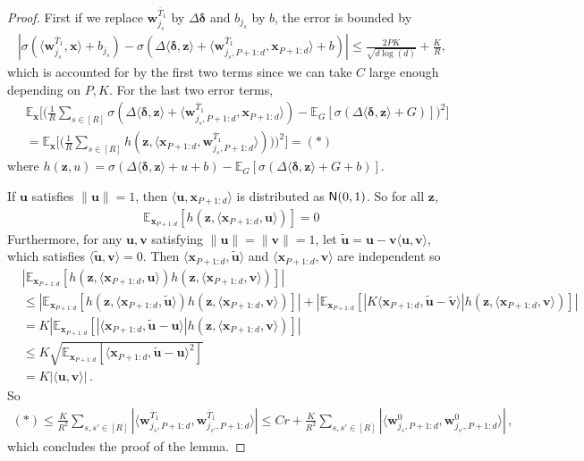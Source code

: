 \documentclass[11pt]{article}
\newcommand{\E}{\mathbb{E}}
\newcommand{\<}{\langle}
\renewcommand{\>}{\rangle}
\theoremstyle{definition}
\def\bu{{\boldsymbol u}}
\def\bv{{\boldsymbol v}}
\def\bw{{\boldsymbol w}}
\def\bx{{\boldsymbol x}}
\def\bz{{\boldsymbol z}}
\def\bdelta{{\boldsymbol\delta}}
\def\normal{{\sf N}}
\def\normal{{\sf N}}
\def\normal{{\sf N}}
\def\bz{{\boldsymbol z}}
\def\bdelta{{\boldsymbol\delta}}
\def\bu{{\boldsymbol u}}
\def\bv{{\boldsymbol v}}
\def\bw{{\boldsymbol w}}
\def\bx{{\boldsymbol x}}
\def\bz{{\boldsymbol z}}
\def\normal{{\sf N}}
\def\bu{{\boldsymbol u}}
\def\bu{{\boldsymbol u}}
\def\oT{\overline{T}}
\begin{document}
\begin{proof}
First if we replace $\bw_{j_s}^{\oT_1}$ by $\Delta \bdelta$ and $b_{j_s}$ by $b$, the error is bounded by
\begin{align*}
|\sigma(\<\bw_{j_s}^{\oT_1},\bx\> + b_{j_s}) - \sigma(\Delta \<\bdelta,\bz\>+\<\bw_{j_s,P+1:d}^{\oT_1},\bx_{P+1:d}\> + b)| \leq  \frac{2PK}{\sqrt{d\log(d)}} + \frac{K}{R},
\end{align*}
which is accounted for by the first two terms since we can take $C$ large enough depending on $P,K$. For the last two error terms, 
\begin{align*}
&\E_\bx \Big[ \Big( \frac{1}{R} \sum_{s \in [R]} \sigma ( \Delta \<\bdelta , \bz\> + \< \bw_{j_s,P+1:d}^{\oT_1} , \bx_{P+1:d} \>) -  \E_G [ \sigma ( \Delta \<\bdelta , \bz\> +G )] \Big)^2 \Big] \\
&= \E_\bx \Big[\Big(\frac{1}{R} \sum_{s \in [R]} h(\bz,\<\bx_{P+1:d},\bw_{j_s,P+1:d}^{\oT_1}\>))\Big)^2\Big] = (\ast)
\end{align*}
where $h(\bz,u) = \sigma ( \Delta \<\bdelta , \bz\> + u + b) - \E_G [ \sigma ( \Delta \<\bdelta , \bz\>+G +b)]$.

If $\bu$ satisfies $\|\bu\| = 1$, then $\<\bu,\bx_{P+1:d}\>$ is distributed as $\normal(0,1)$. So for all $\bz$,
\begin{align*}
\E_{\bx_{P+1:d}}[h(\bz,\<\bx_{P+1:d},\bu\>)] = 0\,
\end{align*}
Furthermore, for any $\bu,\bv$ satisfying $\|\bu\| = \|\bv\| = 1$, let $\tilde{\bu} = \bu - \bv \<\bu,\bv\>$, which satisfies $\<\tilde{\bu},\bv\> = 0$. Then $\<\bx_{P+1:d},\tilde{\bu}\>$ and $\<\bx_{P+1:d},\bv\>$ are independent so
\begin{align*}
&|\E_{\bx_{P+1:d}}[h(\bz,\<\bx_{P+1:d},\bu\>)h(\bz,\<\bx_{P+1:d},\bv\>)]| \\
&\leq |\E_{\bx_{P+1:d}}[h(\bz,\<\bx_{P+1:d},\tilde{\bu}\>)h(\bz,\<\bx_{P+1:d},\bv\>)]| + |\E_{\bx_{P+1:d}}[|K\<\bx_{P+1:d},\tilde{\bu} - \tilde{\bv}\>|h(\bz,\<\bx_{P+1:d},\bv\>)]| \\
&= K|\E_{\bx_{P+1:d}}[|\<\bx_{P+1:d},\tilde{\bu} - \bu\>|h(\bz,\<\bx_{P+1:d},\bv\>)]| \\
&\leq K \sqrt{\E_{\bx_{P+1:d}}[\<\bx_{P+1:d},\tilde{\bu} - \bu\>^2]} \\
&= K |\<\bu,\bv\>|\,.
\end{align*}
So
\begin{align*}
(\ast) \leq \frac{K}{R^2} \sum_{s,s' \in [R]} |\<\bw_{j_s,P+1:d}^{\oT_1},\bw_{j_{s'},P+1:d}^{\oT_1}\>| \leq Cr + \frac{K}{R^2} \sum_{s,s' \in [R]} |\<\bw_{j_s,P+1:d}^{0},\bw_{j_{s'},P+1:d}^{0}\>|\,,
\end{align*}
which concludes the proof of the lemma.
\end{proof}
\end{document}
